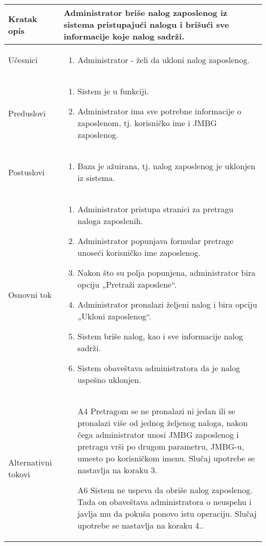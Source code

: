\documentclass[../main.tex]{subfiles}
\begin{document}
\begin{longtable}{| p{} | p{} |} 

\hline
    Kratak opis &  Administrator briše nalog zaposlenog iz sistema pristupajući nalogu i brišući sve informacije koje nalog sadrži.\\ 
\hline    
    Učesnici & 
    	\begin{enumerate}
        \item Administrator - želi da ukloni nalog zaposlenog.
     \end{enumerate}\\
\hline
   Preduslovi & \begin{enumerate}
       \item Sistem je u funkciji.
       \item Administrator ima sve potrebne informacije o zaposlenom, tj. korisničko ime i JMBG zaposlenog.
   \end{enumerate}\\
\hline  
    Postuslovi & \begin{enumerate}
        \item Baza je ažuirana, tj. nalog zaposlenog je uklonjen iz sistema.
    \end{enumerate}\\
\hline
    Osnovni tok & \begin{enumerate}
        \item Administrator pristupa stranici za pretragu naloga zaposlenih.
        \item Administrator popunjava formular pretrage unoseći korisničko ime zaposlenog.
        \item Nakon što su polja popunjena, administrator bira opciju „Pretraži zaposlene“.
        \item Administrator pronalazi željeni nalog i bira opciju „Ukloni zaposlenog“.
        \item Sistem briše nalog, kao i sve informacije nalog sadrži.
        \item Sistem obaveštava administratora da je nalog uspešno uklonjen.
    \end{enumerate}\\
\hline
    Alternativni tokovi & \begin{itemize}
        \item[A4]  Pretragom se ne pronalazi ni jedan ili se pronalazi više od jednog željenog naloga, nakon čega administrator unosi JMBG zaposlenog i pretragu vrši po drugom parametru, JMBG-u, umesto po korisničkom imenu. Slučaj upotrebe se nastavlja na koraku 3.
        \item[A6]  Sistem ne uspeva da obriše nalog zaposlenog. Tada on obaveštava administratora o neuspehu i javlja mu da pokuša ponovo istu operaciju. Slučaj upotrebe se nastavlja na koraku 4..


\end{itemize}
\end{longtable}
\end{document}

